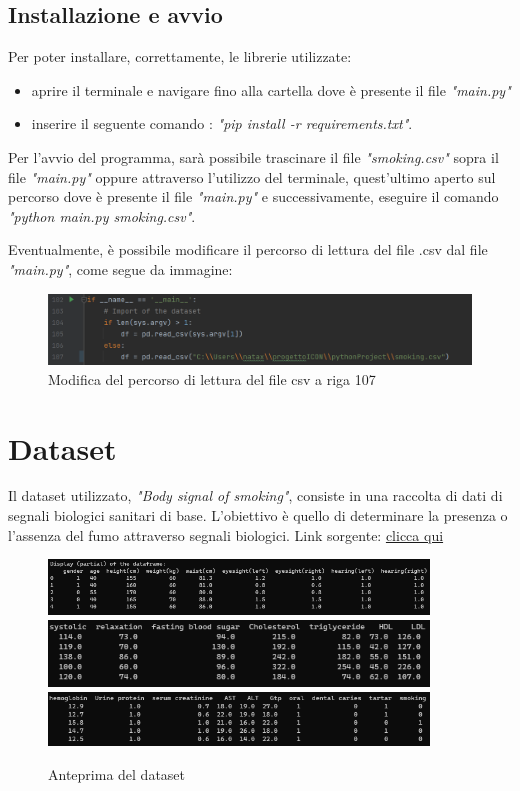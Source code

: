 \documentclass{article}
\begin{document}
\subsection{Installazione e avvio}

Per poter installare, correttamente, le librerie utilizzate:
\begin{itemize}
    \item aprire il terminale e navigare fino alla cartella dove è presente il file \textit{"main.py"}
    \item inserire il seguente comando : \textit{"pip install -r requirements.txt"}.
\end{itemize}
%
Per l'avvio del programma, sarà possibile trascinare il file \textit{"smoking.csv"} sopra il file \textit{"main.py"} oppure attraverso l'utilizzo del terminale, quest'ultimo aperto sul percorso dove è presente il file \textit{"main.py"} e successivamente, eseguire il comando \textit{"python main.py smoking.csv"}.
%

\noindent
Eventualmente, è possibile modificare il percorso di lettura del file .csv dal file \textit{"main.py"}, come segue da immagine:

\begin{figure}[H]
        \includegraphics [width=0.8 cm + \textwidth]{modify}
        \centering
        \caption{Modifica del percorso di lettura del file csv a riga 107}
        \centering
\end{figure}

\section{Dataset}

Il dataset utilizzato, \textit{"Body signal of smoking"}, consiste in una raccolta di dati di segnali biologici sanitari di base. 
%
L'obiettivo è quello di determinare la presenza o l'assenza del fumo attraverso segnali biologici.
%
Link sorgente: \href{https://www.kaggle.com/datasets/kukuroo3/body-signal-of-smoking}{clicca qui}

\begin{figure}[H]
        \includegraphics[width=0.9\textwidth]{display 1}
        \includegraphics[width=0.9\textwidth]{display 2}
        \includegraphics[width=0.9\textwidth]{display 3}
        \centering
        \caption{Anteprima del dataset}
        \centering
\end{figure}
\end{document}
